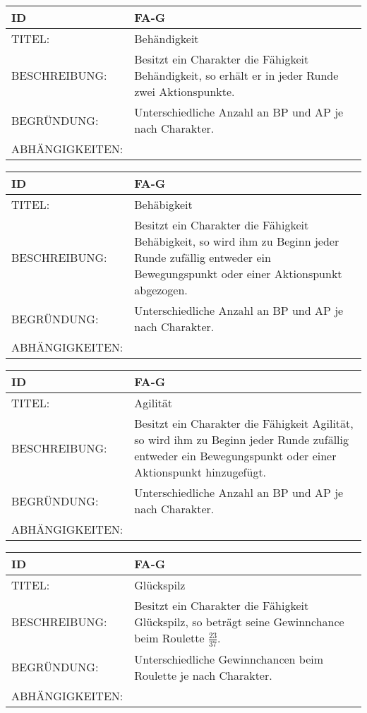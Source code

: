 \begin{tabularx}{16cm}{l|X}
	{table}\label{Behaendigkeit}
	\textbf{ID} & \textbf{FA-G \arabic{table}} \\
	\hline
	TITEL: & Behändigkeit \\
	\hline
	BESCHREIBUNG: & Besitzt ein Charakter die Fähigkeit Behändigkeit, so erhält er in jeder Runde zwei Aktionspunkte.\\
	\hline
	BEGRÜNDUNG: & Unterschiedliche Anzahl an BP und AP je nach Charakter.\\
	\hline
	ABHÄNGIGKEITEN: & \\
\end{tabularx}

\begin{tabularx}{16cm}{l|X}
	{table}\label{Behaebigkeit}
	\textbf{ID} & \textbf{FA-G \arabic{table}} \\
	\hline
	TITEL: & Behäbigkeit \\
	\hline
	BESCHREIBUNG: & Besitzt ein Charakter die Fähigkeit Behäbigkeit, so wird ihm zu Beginn jeder Runde zufällig entweder ein Bewegungspunkt oder einer Aktionspunkt abgezogen.\\
	\hline
	BEGRÜNDUNG: & Unterschiedliche Anzahl an BP und AP je nach Charakter.\\
	\hline
	ABHÄNGIGKEITEN: & \\
\end{tabularx}

\begin{tabularx}{16cm}{l|X}
	{table}\label{Agilitaet}
	\textbf{ID} & \textbf{FA-G \arabic{table}} \\
	\hline
	TITEL: & Agilität \\
	\hline
	BESCHREIBUNG: & Besitzt ein Charakter die Fähigkeit Agilität, so wird ihm zu Beginn jeder Runde zufällig entweder ein Bewegungspunkt oder einer Aktionspunkt hinzugefügt.\\
	\hline
	BEGRÜNDUNG: & Unterschiedliche Anzahl an BP und AP je nach Charakter.\\
	\hline
	ABHÄNGIGKEITEN: & \\
\end{tabularx}

\begin{tabularx}{16cm}{l|X}
	{table}\label{Glueckspilz}
	\textbf{ID} & \textbf{FA-G \arabic{table}} \\
	\hline
	TITEL: & Glückspilz \\
	\hline
	BESCHREIBUNG: & Besitzt ein Charakter die Fähigkeit Glückspilz, so beträgt seine Gewinnchance beim Roulette $\frac{23}{37}$.\\
	\hline
	BEGRÜNDUNG: & Unterschiedliche Gewinnchancen beim Roulette je nach Charakter.\\
	\hline
	ABHÄNGIGKEITEN: & \\
\end{tabularx}

